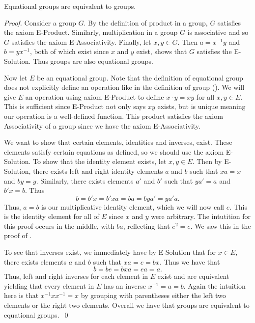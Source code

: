 \documentclass{article}
\begin{document}
\begin{theorem}
  Equational groups are equivalent to groups.
\end{theorem}
\begin{proof}
  Consider a group $G$.
  By the definition of product in a group, $G$ satisfies the axiom E-Product.
  Similarly, multiplication in a group $G$ is associative and so $G$ satisfies the axiom E-Associativity.
  Finally, let $x, y \in G$.
  Then $a = x^{-1}y$ and $b = yx^{-1}$, both of which exist since $x$ and $y$ exist, shows that $G$ satisfies the E-Solution.
  Thus groups are also equational groups.

  Now let $E$ be an equational group.
  Note that the definition of equational group does not explicitly define an operation like in the definition of group ().
  We will give $E$ an operation using axiom E-Product to define $x \cdot y = xy$ for all $x, y \in E$.
  This is sufficient since E-Product not only says $xy$ exists, but is unique meaning our operation is a well-defined function.
  This product satisfies the axiom Associativity of a group since we have the axiom E-Associativity.

  We want to show that certain elements, identities and inverses, exist.
  These elements satisfy certain equations as defined, so we should use the axiom E-Solution.
  To show that the identity element exists, let $x, y \in E$.
  Then by E-Solution, there exists left and right identity elements $a$ and $b$ such that $xa = x$ and $by = y$.
  Similarly, there exists elements $a'$ and $b'$ such that $ya' = a$ and $b'x = b$.
  Thus
  \[
    b = b'x = b'xa = ba = bya' = ya' a.
  \]
  Thus, $a = b$ is our multiplicative identity element, which we will now call $e$.
  This is the identity element for all of $E$ since $x$ and $y$ were arbitrary.
  The intutition for this proof occurs in the middle, with $ba$, reflecting that $e^{2} = e$.
  We saw this in the proof of .

  To see that inverses exist, we immediately have by E-Solution that for $x \in E$, there exists elements $a$ and $b$ such that $xa = e = bx$.
  Thus we have that
  \[
    b = be = bxa = ea = a.
  \]
  Thus, left and right inverses for each element in $E$ exist and are equivalent yielding that every element in $E$ has an inverse $x^{-1} = a = b$.
  Again the intuition here is that $x^{-1} x x^{-1} = x$ by grouping with parentheses either the left two elements or the right two elements.
  Overall we have that groups are equivalent to equational groups.\ \qed
\end{proof}
\end{document}
